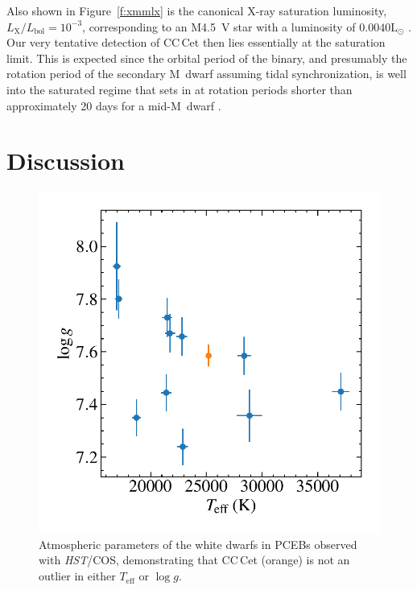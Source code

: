 \documentclass[fleqn,usenatbib]{mnras}
\begin{document}
Also shown in Figure~\ref{f:xmmlx} is the canonical X-ray saturation luminosity, $L_\mathrm{X}/L_\mathrm{bol}=10^{-3}$, corresponding to an M4.5~V star with a luminosity of $0.0040\mathrm{L}_\odot$ \citep{pecaut+mamajek13-1}.  Our very tentative detection of CC\,Cet then lies essentially at the saturation limit.  This is expected since the orbital period of the binary, and presumably the rotation period of the secondary M~dwarf assuming tidal synchronization, is well into the saturated regime that sets in at rotation periods shorter than approximately 20 days for a mid-M~dwarf \citep[e.g.][]{Wright.etal:11}.

\section{Discussion}
\label{sec:dis}


\begin{figure}
    \centering
    \includegraphics[width=8 cm]{teffvlogg.pdf}
    \caption{Atmospheric parameters of the white dwarfs in PCEBs observed with \textit{HST}/COS, demonstrating that CC\,Cet (orange) is not an outlier in either $T_{\mathrm{eff}}$ or $\log g$.}
    \label{fig:tefflogg}
\end{figure}
\end{document}
